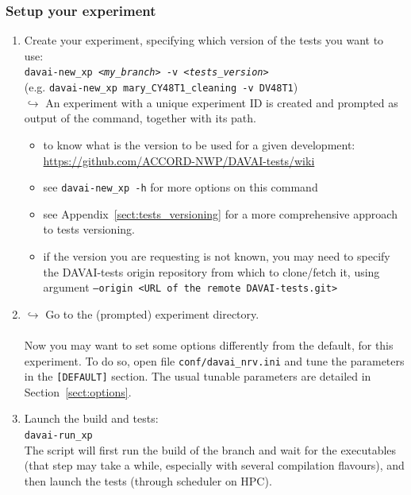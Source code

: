 \documentclass[a4paper,10pt,twoside]{article}
\begin{document}
\subsubsection{Setup your experiment}
\begin{enumerate}[label=(\alph*)]
 \item Create your experiment, specifying which version of the tests you want to use:\\
 \texttt{davai-new\_xp \textit{<my\_branch>} -v \textit{<tests\_version>}}\\
 (e.g. \texttt{davai-new\_xp mary\_CY48T1\_cleaning -v DV48T1})\\
 $\hookrightarrow$ An experiment with a unique experiment ID is created and prompted as output of the command, together with its path. 
 \begin{itemize}
  \item to know what is the version to be used for a given development:\\
  \href{https://github.com/ACCORD-NWP/DAVAI-tests/wiki}{https://github.com/ACCORD-NWP/DAVAI-tests/wiki}
  \item see \texttt{davai-new\_xp -h} for more options on this command
  \item see Appendix~\ref{sect:tests_versioning} for a more comprehensive approach to tests versioning.
 
  \item if the version you are requesting is not known, you may need to specify the DAVAI-tests origin repository from which to clone/fetch it, using argument \texttt{--origin <URL of the remote DAVAI-tests.git>}
 \end{itemize}
 \item $\hookrightarrow$ Go to the (prompted) experiment directory.\\
 \\
 Now you may want to set some options differently from the default, for this experiment. To do so, open file \texttt{conf/davai\_nrv.ini} and tune the parameters in the \texttt{[DEFAULT]} section. The usual tunable parameters are detailed in Section~\ref{sect:options}.
 \item Launch the build and tests:\\
 \texttt{davai-run\_xp}\\
 The script will first run the build of the branch and wait for the executables (that step may take a while, especially with several compilation flavours), and then launch the tests (through scheduler on HPC).
\end{enumerate}
\end{document}
